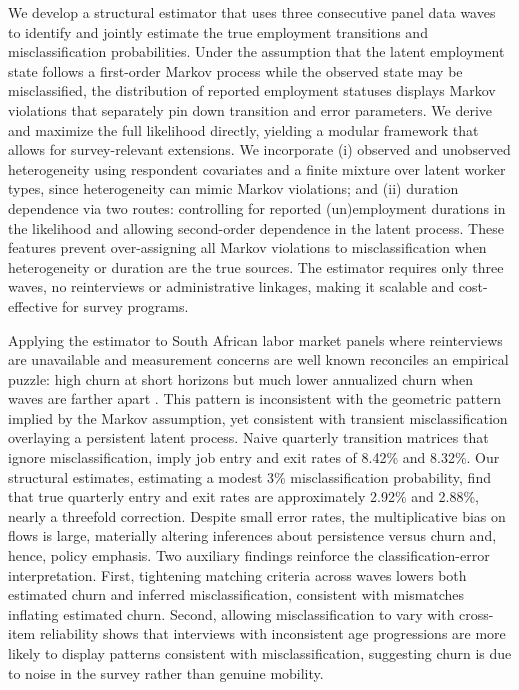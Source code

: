 \documentclass[letterpaper,12pt,final,dvipsnames]{article}
\begin{document}
We develop a structural estimator that uses three consecutive panel data waves to identify and jointly estimate the true employment transitions and misclassification probabilities. Under the assumption that the latent employment state follows a first-order Markov process while the observed state may be misclassified, the distribution of reported employment statuses displays Markov violations that separately pin down transition and error parameters. We derive and maximize the full likelihood directly, yielding a modular framework that allows for survey-relevant extensions. We incorporate (i) observed and unobserved heterogeneity using respondent covariates and a finite mixture over latent worker types, since heterogeneity can mimic Markov violations; and (ii) duration dependence via two routes: controlling for reported (un)employment durations in the likelihood and allowing second-order dependence in the latent process. These features prevent over-assigning all Markov violations to misclassification when heterogeneity or duration are the true sources. The estimator requires only three waves, no reinterviews or administrative linkages, making it scalable and cost-effective for survey programs.

Applying the estimator to South African labor market panels where reinterviews are unavailable and measurement concerns are well known \citep{aguero2007, dinkelman2004} reconciles an empirical puzzle: high churn at short horizons but much lower annualized churn when waves are farther apart \citep{banerjee2008}. This pattern is inconsistent with the geometric pattern implied by the Markov assumption, yet consistent with transient misclassification overlaying a persistent latent process. Naive quarterly transition matrices that ignore misclassification, imply job entry and exit rates of 8.42\% and 8.32\%. Our structural estimates, estimating a modest 3\% misclassification probability, find that true quarterly entry and exit rates are approximately 2.92\% and 2.88\%, nearly a threefold correction. Despite small error rates, the multiplicative bias on flows is large, materially altering inferences about persistence versus churn and, hence, policy emphasis. Two auxiliary findings reinforce the classification-error interpretation. First, tightening matching criteria across waves lowers both estimated churn and inferred misclassification, consistent with mismatches inflating estimated churn. Second, allowing misclassification to vary with cross-item reliability shows that interviews with inconsistent age progressions are more likely to display patterns consistent with misclassification, suggesting churn is due to noise in the survey rather than genuine mobility. 




\begingroup
{}

\clearpage
	
	
%	
\endgroup


\appendix


    
\end{document}
